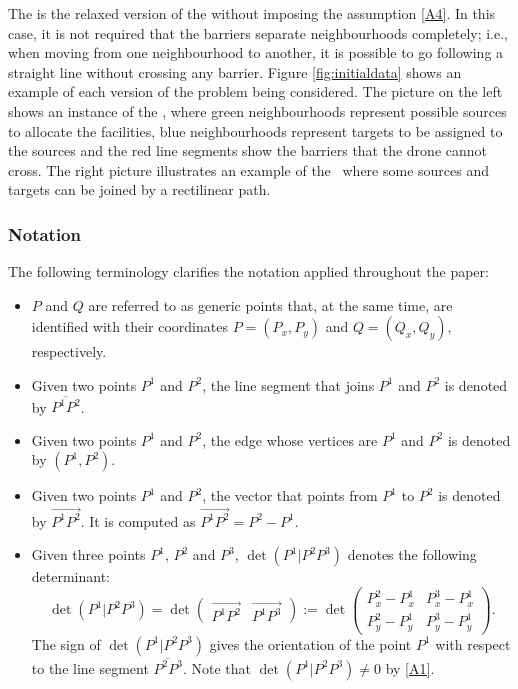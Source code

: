 \documentclass[a4paper,  review, authoryear, 1p.]{elsarticle}
\newcommand{\KMPHN}{{\sf{H-KMPHN}}}
\newcommand{\KMPN}{{\sf{H-KMPN}\xspace }}
\newcommand{\segment}[2]{\overline{#1#2}}
\newcommand{\determinant}[3]{\det({#1|#2#3})}
\begin{document}
	The \KMPN\xspace is the relaxed version of the \KMPHN\xspace without imposing the assumption \ref{A4}. In this case, it is not required that the barriers separate neighbourhoods completely; i.e., when moving from one neighbourhood to another, it is possible to go following a straight line without crossing any barrier. Figure \ref{fig:initialdata} shows an example of each version of the problem being considered. The picture on the left shows an instance of the \KMPHN, where green neighbourhoods represent possible sources to allocate the facilities, blue neighbourhoods represent targets to be assigned to the sources and the red line segments show the barriers that the drone cannot cross. The right picture illustrates an example of the \KMPN \ where some sources and targets can be joined by a rectilinear path.
	
	
	
	\subsubsection*{Notation} 
	
	The following terminology clarifies the notation applied throughout the paper: 
	\begin{itemize}
		\item $P$ and $Q$ are referred to as generic points that, at the same time, are identified with their coordinates $P=(P_x, P_y)$ and $Q=(Q_x, Q_y)$, respectively.
		\item Given two points $P^1$ and $P^2$, the line segment that joins $P^1$ and $P^2$ is denoted by $\segment{P^1}{P^2}$.
		\item  Given two points $P^1$ and $P^2$, the edge whose vertices are $P^1$ and $P^2$ is denoted by $(P^1, P^2)$.
		\item  Given two points $P^1$ and $P^2$, the vector that points from $P^1$ to $P^2$ is denoted by $\overrightarrow{P^1P^2}$. It is computed as
		$\overrightarrow{P^1P^2}=P^2-P^1.$
		\item Given three points $P^1$, $P^2$ and $P^3$, $\determinant{P^1}{P^2}{P^3}$ denotes the following determinant:
		$$
		\determinant{P^1}{P^2}{P^3}=\det\left(\begin{array}{c|c} \overrightarrow{P^1P^2} & \overrightarrow{P^1P^3}\end{array}\right):=\det\left( \begin{array}{cc}  P^2_x-P^1_x & P^3_x-P^1_x \\ P_y^2-P^1_y & P_y^3-P_y^1 \end{array}\right).
		$$
		The sign of $\determinant{P^1}{P^2}{P^3}$ gives the orientation of the point $P^1$ with respect to the line segment $\segment{P^2}{P^3}.$ Note that $\determinant{P^1}{P^2}{P^3}\neq 0$ by \ref{A1}. 
	\end{itemize} 
		
\end{document}
